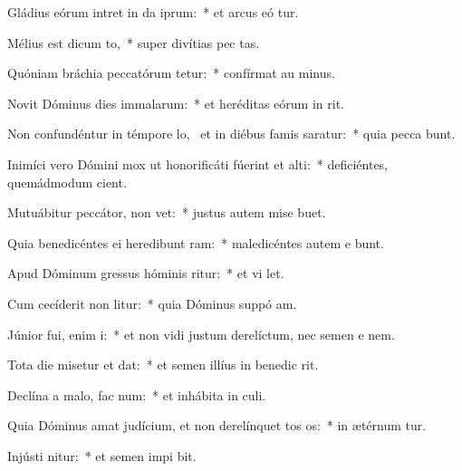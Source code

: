 \item Gládius eórum intret in da iprum:~* et arcus eó tur.
\item Mélius est dicum to,~* super divítias pec tas.
\item Quóniam bráchia peccatórum tetur:~* confírmat au  minus.
\item Novit Dóminus dies immalarum:~* et heréditas eórum in  rit.
\item Non confundéntur in témpore lo,~\pscross{} et in diébus famis saratur:~* quia pecca bunt.
\item Inimíci vero Dómini mox ut honorificáti fúerint et alti:~* deficiéntes, quemádmodum  cient.
\item Mutuábitur peccátor,  non vet:~* justus autem mise  buet.
\item Quia benedicéntes ei heredibunt ram:~* maledicéntes autem e bunt.
\item Apud Dóminum gressus hóminis ritur:~* et vi  let.
\item Cum cecíderit non litur:~* quia Dóminus suppó  am.
\item Júnior fui, enim i:~* et non vidi justum derelíctum, nec semen e  nem.
\item Tota die misetur et dat:~* et semen illíus in benedic rit.
\item Declína a malo,  fac num:~* et inhábita in  culi.
\item Quia Dóminus amat judícium, et non derelínquet tos os:~* in ætérnum tur.
\item Injústi nitur:~* et semen impi bit.
